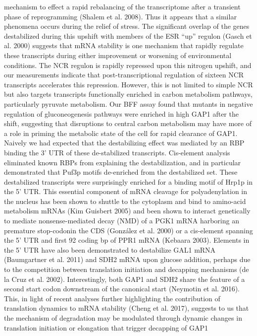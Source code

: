 mechanism to effect a rapid rebalancing of the transcriptome after a
transient phase of reprogramming (Shalem et al. 2008). Thus it appears
that a similar phenomena occurs during the relief of stress. The
significant overlap of the genes destabilized during this upshift with
members of the ESR “up” regulon (Gasch et al. 2000) suggests that mRNA
stability is one mechanism that rapidly regulate these transcripts
during either improvement or worsening of environmental conditions.
The NCR regulon is rapidly repressed upon this nitrogen upshift, and
our measurements indicate that post-transcriptional regulation of
sixteen NCR transcripts accelerates this repression. However, this is
not limited to simple NCR but also targets transcripts functionally
enriched in carbon metabolism pathways, particularly pyruvate
metabolism. Our BFF assay found that mutants in negative regulation of
gluconeogenesis pathways were enriched in high GAP1 after the shift,
suggesting that disruptions to central carbon metabolism may have more
of a role in priming the metabolic state of the cell for rapid
clearance of GAP1.  Naively we had expected that the destabilizing
effect was mediated by an RBP binding the 3’ UTR of these
de-stabilized transcripts. Cis-element analysis eliminated known RBPs
from explaining the destabilization, and in particular demonstrated
that  Puf3p motifs de-enriched from the  destabilized set. These
destabilized transcripts were surprisingly enriched for a binding
motif of Hrp1p in the 5’ UTR. This essential component of mRNA
cleavage for polyadenylation in the nucleus  has been shown to shuttle
to the cytoplasm and bind to amino-acid metabolism mRNAs (Kim Guisbert
2005) and been shown to interact genetically to mediate
nonsense-mediated decay (NMD) of a PGK1 mRNA harboring an premature
stop-codonin the CDS (González et al. 2000) or a cis-element spanning
the 5’ UTR and first 92 coding bp of PPR1 mRNA (Kebaara 2003).
Elements in the 5’ UTR have also been demonstrated to destabilize GAL1
mRNA (Baumgartner et al. 2011) and SDH2 mRNA upon glucose addition,
perhaps due to the competition between translation initiation and
decapping mechanisms (de la Cruz et al. 2002). Interestingly, both
GAP1 and SDH2 share the feature of a second start codon downstream of
the canonical start (Neymotin et al. 2016). This, in light of recent
analyses further highlighting the contribution of translation dynamics
to mRNA stability (Cheng et al. 2017), suggests to us that the
mechanism of degradation may be modulated through dynamic changes in
translation initiation or elongation that trigger decapping of GAP1
